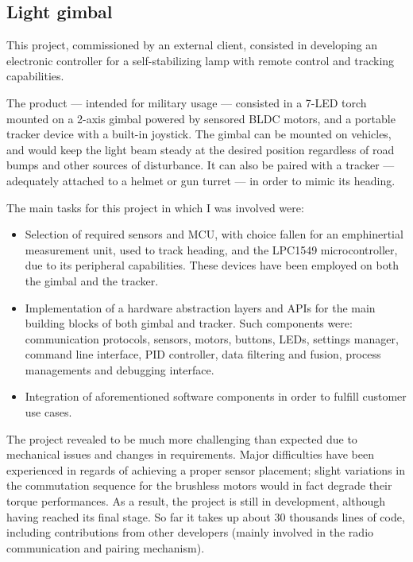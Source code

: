 \subsection{Light gimbal}
This project, commissioned by an external client, consisted in developing an electronic controller for a self-stabilizing lamp with remote control and tracking capabilities.

The product --- intended for military usage --- consisted in a 7-LED torch mounted on a 2-axis gimbal powered by sensored BLDC motors, and a portable tracker device with a built-in joystick.
The gimbal can be mounted on vehicles, and would keep the light beam steady at the desired position regardless of road bumps and other sources of disturbance.
It can also be paired with a tracker --- adequately attached to a helmet or gun turret --- in order to mimic its heading.

The main tasks for this project in which I was involved were:
\begin{itemize}
\item Selection of required sensors and MCU, with choice fallen for an emph{inertial measurement unit}, used to track heading, and the LPC1549 microcontroller, due to its peripheral capabilities. These devices have been employed on both the gimbal and the tracker.
\item Implementation of a hardware abstraction layers and APIs for the main building blocks of both gimbal and tracker. Such components were: communication protocols, sensors, motors, buttons, LEDs, settings manager, command line interface, PID controller, data filtering and fusion, process managements and debugging interface.
\item Integration of aforementioned software components in order to fulfill customer use cases.
\end{itemize}

The project revealed to be much more challenging than expected due to mechanical issues and changes in requirements.
Major difficulties have been experienced in regards of achieving a proper sensor placement; slight variations in the commutation sequence for the brushless motors would in fact degrade their torque performances.
As a result, the project is still in development, although having reached its final stage.
So far it takes up about 30 thousands lines of code, including contributions from other developers (mainly involved in the radio communication and pairing mechanism).
